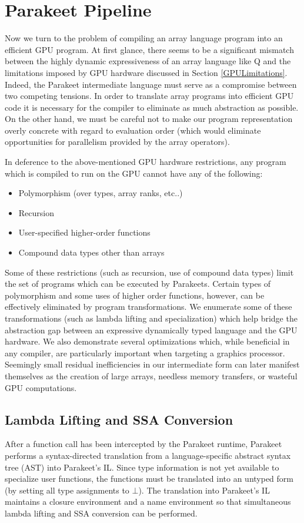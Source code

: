 \documentclass[10pt,twocolumn]{article}
\begin{document}
\section{Parakeet Pipeline}
\label{Pipeline}
Now we turn to the problem of compiling an array language program into an efficient GPU program. At first glance, there seems to be a significant mismatch between the highly dynamic expressiveness of an array language like Q and the limitations imposed by GPU hardware discussed in Section \ref{GPULimitations}. Indeed, the Parakeet intermediate language must serve as a compromise between two competing tensions. In order to translate array programs into efficient GPU code it is necessary for the compiler to eliminate as much abstraction as possible. On the other hand, we must be careful not to make our program representation overly concrete with regard to evaluation order (which would eliminate opportunities for parallelism provided by the array operators). 

In deference to the above-mentioned GPU hardware restrictions, any program which is compiled to run on the GPU cannot have any of the following:

\begin{itemize}
\item Polymorphism (over types, array ranks, etc..) 
\item Recursion
\item User-specified higher-order functions
\item Compound data types other than arrays
\end{itemize}

Some of these restrictions (such as recursion, use of compound data types) limit the set of programs which can be executed by Parakeets. Certain types of polymorphism and some uses of higher order functions, however, can be effectively eliminated by program transformations. We enumerate some of these transformations (such as lambda lifting and specialization) which help bridge the abstraction gap between an expressive dynamically typed language and the GPU hardware. We also demonstrate several optimizations which, while beneficial in any compiler, are particularly important when targeting a graphics processor. Seemingly small residual inefficiencies in our intermediate form can later manifest themselves as the creation of large arrays, needless memory transfers, or wasteful GPU computations.

\subsection{Lambda Lifting and SSA Conversion}
After a function call has been intercepted by the Parakeet runtime, Parakeet performs a syntax-directed translation from a language-specific abstract syntax tree (AST) into Parakeet's IL. Since type information is not yet available to specialize user functions, the functions must be translated into an untyped
form (by setting all type assignments to $\bot$). The translation into Parakeet's IL maintains a closure environment and a name environment so that simultaneous lambda lifting and SSA conversion can be performed.
\end{document}
